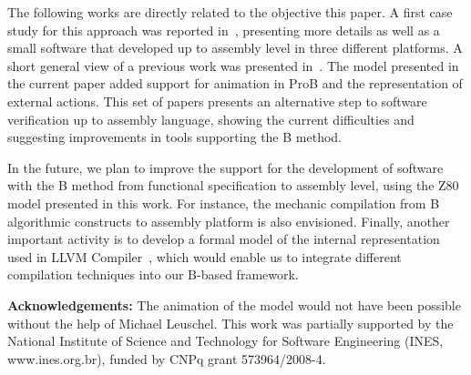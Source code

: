 \documentclass[a4paper]{llncs}
\begin{document}
The following works are directly related to the objective this paper.
A first case study for this approach was reported in~\cite{Dantas_SBMF08}, presenting
more details as well as a small software that developed up to assembly
level in three different platforms. A short general view of a previous work
was presented in~\cite{Valerio_SBMF09}. The model presented in the 
current paper added support for animation in ProB and the representation
of external actions.
This set of papers presents an alternative step to software verification
up to assembly language, showing the current difficulties and
suggesting improvements in tools supporting the B method.

In the future, we plan to improve the support for the development of
software with the B method from functional specification to assembly
level, using the Z80 model presented in this work. For instance, the
mechanic compilation from B algorithmic constructs to assembly
platform is also envisioned. Finally, another important activity is to
develop a formal model of the internal representation used in LLVM
Compiler~\cite{DBLP:conf/cgo/LattnerA04}, which would enable us to
integrate different compilation techniques into our B-based framework.


\textbf{Acknowledgements:} The animation of the model would not
have been possible without the help of Michael Leuschel. %
This work was partially supported by the National Institute of Science and Technology for Software Engineering (INES, www.ines.org.br), funded by CNPq grant 573964/2008-4.



\end{document}
